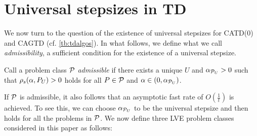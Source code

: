\section{Universal stepsizes in TD}\label{sec:rl}
We now turn to the question of the existence of universal stepsizes for CATD(0) and CAGTD (cf. \cref{tb:tdalgos}). 
In what follows, we define what we call \emph{admissibility}, 
a sufficient condition for the existence of a universal stepsize. 
\begin{definition}\label{def:admis}
Call a problem class $\P$ \emph{admissible} if there exists a unique $U$ and $\alpha_{\P_U}>0$ such that
$\rhos{P_U}>0$ holds for all $P\in \P$ and $\alpha\in(0,\alpha_{\P_U})$.
\end{definition}
If $\P$ is admissible, it also follows that an asymptotic fast rate of $O(\frac1t)$ is achieved. To see this, we can choose $\alpha_{\P_U}$ to be the universal stepsize and then  holds for all the problems in $\P$. We now define three LVE problem classes considered in this paper as follows:
\begin{comment}
\begin{table}
\resizebox{\columnwidth}{!}{
\begin{tabular}{|c|c|c|c|}\hline
Class &Fixed &Variable &Remark\\\hline
$\P_{TDON}$ & $\Phi,S,A,\gamma$ & $\pi,P,R$ &$\mu=d_{\pi}, \EE{\phi_t\phi_t}=\EE{\phi'_t\phi'_t}$\\\hline
$\P_{TDOFF}$ & $\Phi,S,A,\gamma$ & $\pi,\mu,P,R$ &$\mu\neq d_{\pi}, \EE{\phi_t\phi_t}=\EE{\phi'_t\phi'_t}$, $\norm{\phi_t}=1$\\\hline
$\P_{GTDOFF}$ & $\Phi,S,A,\gamma$ & $\pi,\mu,P,R$ &$\mu\neq d_{\pi}$\\\hline
\end{tabular}
}
\end{table}
\end{comment}
\FloatBarrier
\begin{table}[h]
\caption{Here, $S,A,\gamma$ are fixed across all the class and the second column shows the quantities that vary across the respective classes. These three capture \emph{on/off-policy} learning scenarios arising in RL.}
\end{table}
